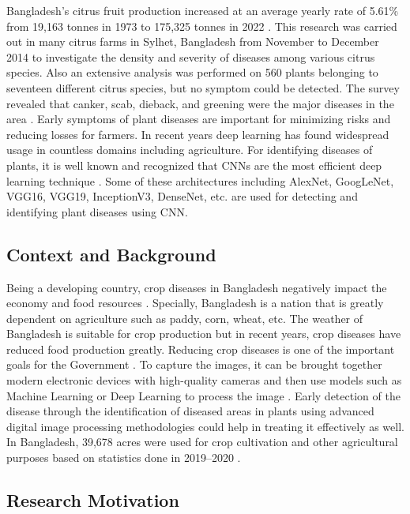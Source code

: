 \documentclass{ijcaArticle}
\begin{document}
Bangladesh's citrus fruit production increased at an average yearly rate of 5.61\% from 19,163 tonnes in 1973 to 175,325 tonnes in 2022 \cite{p22}. This research was carried out in many citrus farms in Sylhet, Bangladesh from November to December 2014 to investigate the density and severity of diseases among various citrus species. Also an extensive analysis was performed on 560 plants belonging to seventeen different citrus species, but no symptom could be detected. The survey revealed that canker, scab, dieback, and greening were the major diseases in the area \cite{p5,p19}. Early symptoms of plant diseases are important for minimizing risks and reducing losses for farmers. In recent years deep learning has found widespread usage in countless domains including agriculture. For identifying diseases of plants, it is well known and recognized that CNNs are the most efficient deep learning technique \cite{p5}. Some of these architectures including AlexNet, GoogLeNet, VGG16, VGG19, InceptionV3, DenseNet, etc. are used for detecting and identifying plant diseases using CNN. 

\subsection{Context and Background}

Being a developing country, crop diseases in Bangladesh negatively impact the economy and food resources \cite{p6,p8}. Specially, Bangladesh is a nation that is greatly dependent on agriculture such as paddy, corn, wheat, etc. The weather of Bangladesh is suitable for crop production but in recent years, crop diseases have reduced food production greatly. Reducing crop diseases is one of the important goals for the Government \cite{p6}. To capture the images, it can be brought together modern electronic devices with high-quality cameras and then use models such as Machine Learning or Deep Learning to process the image \cite{p19,p20}. Early detection of the disease through the identification of diseased areas in plants using advanced digital image processing methodologies could help in treating it effectively as well. In Bangladesh, 39,678 acres were used for crop cultivation and other agricultural purposes based on statistics done in 2019--2020 \cite{p7,p6}.

\subsection{Research Motivation}
\end{document}
